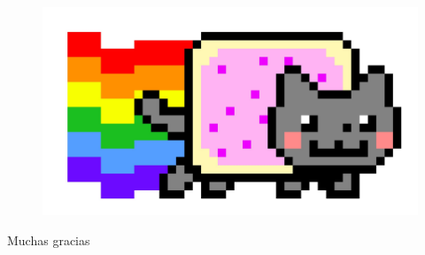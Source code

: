 \begin{frame}
	\begin{center}
		\begin{figure}
			\centering
			\includegraphics[width=0.8\linewidth]{images/goodbye.jpg}
			\label{fig:introfig01}
		\end{figure}
		\vspace{20px}
		\LARGE{Muchas gracias}	
	\end{center}
\end{frame}


